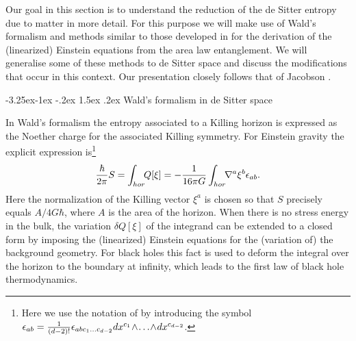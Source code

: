 \documentclass[a4paper,12pt]{article}
\makeatletter
\renewcommand\subsection{\@startsection{subsection}{2}{\z@}%
                                     {-3.25ex\@plus -1ex \@minus -.2ex}%
                                     {1.5ex \@plus .2ex}%
                                     {\normalfont\bfseries}}
\newcommand{\be}{\begin{equation}}
\newcommand{\ee}{\end{equation}}
\makeatother
\begin{document}


Our goal in this section is to understand the reduction of the de Sitter entropy due to matter in more detail. For this purpose we will make use of Wald's formalism \cite{WaldNoether} and methods similar to those developed in \cite{Raamsdonketal, Swingle-vR, Jacobson2} for the derivation of the (linearized) Einstein equations from the area law entanglement.  We will generalise some of these methods to de Sitter space and discuss the modifications that occur in this context. Our presentation closely follows that of Jacobson \cite{Jacobson2}.  

\subsection{Wald's formalism in de Sitter space}

In Wald's formalism \cite{WaldNoether} the entropy associated to a Killing horizon is expressed as the Noether charge for the associated Killing symmetry.  For Einstein gravity the explicit expression is\footnote{Here we use the notation of \cite{Raamsdonketal} by introducing the symbol ${\bf\epsilon}_{ab}= {1\over (d-2)!}\epsilon_{abc_1\ldots c_{d-2}} dx^{c_1}\!\wedge\!\ldots \!\wedge\! dx^{c_{d-2}}$.} 
\be
\label{Noether}
{\hbar\over 2\pi} S = \int_{hor}\!\! Q[\xi] = -{1\over 16\pi G} \int_{hor}\!\!\nabla^a \xi^b {\mathbf \epsilon}_{ab} .
\ee
Here the normalization of the Killing vector $\xi^a$ is chosen so that $S$   precisely  equals $A/4 G\hbar$, where $A$ is the area of 
the horizon.  When there is no stress energy in the bulk, the variation $\delta Q[\xi]$ of the integrand can be extended to a closed form by imposing the (linearized) Einstein equations for the (variation of) the background geometry.  For black holes this fact is used to deform the integral over the horizon to the boundary at infinity, which leads to the first law of black hole thermodynamics. 
\end{document}
